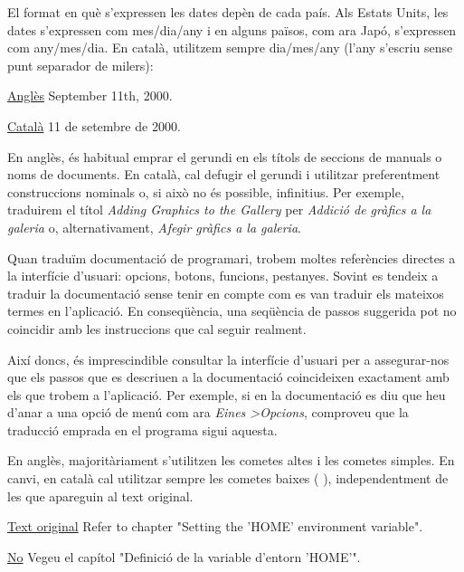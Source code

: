 \documentclass[9pt]{cheatsheet}
\begin{document}
\begin{multicols*}{3}
El format en què s'expressen les dates depèn de cada país. Als Estats Units, les dates s'expressen com mes/dia/any i en alguns països, com ara Japó, s'expressen com any/mes/dia. En català, utilitzem sempre dia/mes/any (l'any s'escriu sense punt separador de milers):

\underline {Anglès} September 11th, 2000.

\underline {Català}	11 de setembre de 2000.



En anglès, és habitual emprar el gerundi en els títols de seccions de manuals o noms de documents. En català, cal defugir el gerundi i utilitzar preferentment construccions nominals o, si això no és possible, infinitius. Per exemple, traduirem el títol \emph{Adding Graphics to the Gallery} per \emph{Addició de gràfics a la galeria} o, alternativament, \emph{Afegir gràfics a la galeria}.


Quan traduïm documentació de programari, trobem moltes referències directes a la interfície d'usuari: opcions, botons, funcions, pestanyes. Sovint es tendeix a traduir la documentació sense tenir en compte com es van traduir els mateixos termes en l'aplicació. En conseqüència, una seqüència de passos suggerida pot no coincidir amb les instruccions que cal seguir realment. 

Així doncs, és imprescindible consultar la interfície d'usuari per a assegurar-nos que els passos que es descriuen a la documentació coincideixen exactament amb els que trobem a l'aplicació. Per exemple, si en la documentació es diu que heu d'anar a una opció de menú com ara \emph{Eines \textgreater Opcions}, comproveu que la traducció emprada en el programa sigui aquesta.



En anglès, majoritàriament s’utilitzen les cometes altes i les cometes simples. En canvi, en català cal utilitzar sempre les cometes baixes ( \guillemotleft\guillemotleft \guillemotright), independentment de les que apareguin al text original.

\underline {Text original} Refer to chapter "Setting the 'HOME' environment variable".

\underline {No} Vegeu el capítol "Definició de la variable d'entorn 'HOME'".


\end{multicols*}
\end{document}

